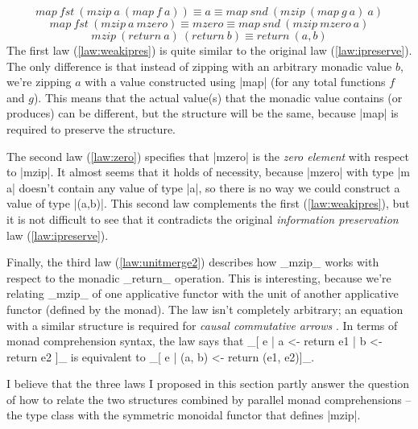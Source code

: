 \documentclass{tmr}
\newcommand{\map}[2]{\mathit{map}\ #1\ #2}
\newcommand{\mzip}[2]{\mathit{mzip}\ #1\ #2}
\newcommand{\fst}{\mathit{fst}}
\newcommand{\snd}{\mathit{snd}}
\newcommand{\mzero}{\mathit{mzero}}
\newcommand{\return}[1]{\mathit{return}\ #1}
\begin{document}
\begin{equation}
  \map \fst {(\mzip a {(\map f a)})} \equiv a \equiv \map \snd {(\mzip
    {(\map g a)} a)}
  \label{law:weakipres}
\end{equation}
\begin{equation}
  \map \fst {(\mzip a \mzero)} \equiv \mzero \equiv \map \snd {(\mzip \mzero a)}
  \label{law:zero}
\end{equation}
\begin{equation}
  \mzip {(\return a)} {(\return b)} \equiv \return {(a, b)}
  \label{law:unitmerge2}
\end{equation}
The first law (\ref{law:weakipres}) is quite similar to the original law (\ref{law:ipreserve}).
The only difference is that instead of zipping with an arbitrary monadic value $b$, we're zipping $a$ 
with a value constructed using |map| (for any total functions $f$ and $g$). This means that the 
actual value(s) that the monadic value contains (or produces) can be different, but the structure will 
be the same, because |map| is required to preserve the structure. 

The second law (\ref{law:zero}) specifies that |mzero| is the \textit{zero element} with respect to 
|mzip|. It almost seems that it holds of necessity, because |mzero| with type |m a| doesn't contain any value of 
type |a|, so there is no way we could construct a value of type 
%
|(a,b)|. This second law complements the 
first (\ref{law:weakipres}), but it is not difficult to see that it contradicts the 
original \textit{information preservation} law (\ref{law:ipreserve}).

\UndefineShortVerb{\|}
\DefineShortVerb{\_}

Finally, the third law (\ref{law:unitmerge2}) describes how _mzip_ works with respect to the monadic 
_return_ operation. This is interesting, because we're relating _mzip_ of one applicative functor with 
the unit of another applicative functor (defined by the monad). The law isn't completely arbitrary;
an equation with a similar structure is required for \textit{causal commutative arrows} \cite{causalarr}.
In terms of monad comprehension syntax, the law says that _[ e | a <- return e1 | b <- return e2 ]_ 
is equivalent to _[ e | (a, b) <- return (e1, e2)]_.

\UndefineShortVerb{\_}
\DefineShortVerb{\|}

I believe that the three laws I proposed in this section partly answer
the question of how to relate
the two structures combined by parallel monad comprehensions -- the  type class
with the symmetric monoidal functor that defines |mzip|.
\end{document}
